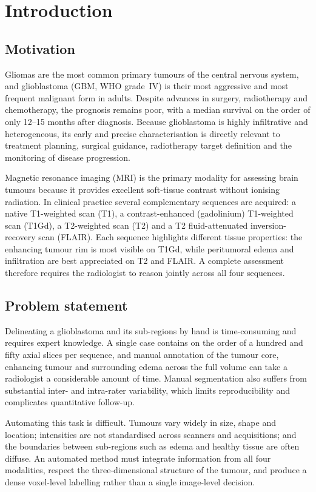 \chapter{Introduction}
\label{ch:introduction}

\section{Motivation}

Gliomas are the most common primary tumours of the central nervous system, and
glioblastoma (GBM, WHO grade~IV) is their most aggressive and most frequent
malignant form in adults. Despite advances in surgery, radiotherapy and
chemotherapy, the prognosis remains poor, with a median survival on the order of
only 12--15 months after diagnosis. Because glioblastoma is highly infiltrative
and heterogeneous, its early and precise characterisation is directly relevant to
treatment planning, surgical guidance, radiotherapy target definition and the
monitoring of disease progression.

Magnetic resonance imaging (MRI) is the primary modality for assessing brain
tumours because it provides excellent soft-tissue contrast without ionising
radiation. In clinical practice several complementary sequences are acquired: a
native T1-weighted scan (T1), a contrast-enhanced (gadolinium) T1-weighted scan
(T1Gd), a T2-weighted scan (T2) and a T2 fluid-attenuated inversion-recovery scan
(FLAIR). Each sequence highlights different tissue properties: the enhancing
tumour rim is most visible on T1Gd, while peritumoral edema and infiltration are
best appreciated on T2 and FLAIR. A complete assessment therefore requires the
radiologist to reason jointly across all four sequences.

\section{Problem statement}

Delineating a glioblastoma and its sub-regions by hand is time-consuming and
requires expert knowledge. A single case contains on the order of a hundred and
fifty axial slices per sequence, and manual annotation of the tumour core,
enhancing tumour and surrounding edema across the full volume can take a
radiologist a considerable amount of time. Manual segmentation also suffers from
substantial inter- and intra-rater variability, which limits reproducibility and
complicates quantitative follow-up.

Automating this task is difficult. Tumours vary widely in size, shape and
location; intensities are not standardised across scanners and acquisitions; and
the boundaries between sub-regions such as edema and healthy tissue are often
diffuse. An automated method must integrate information from all four modalities,
respect the three-dimensional structure of the tumour, and produce a dense
voxel-level labelling rather than a single image-level decision.

